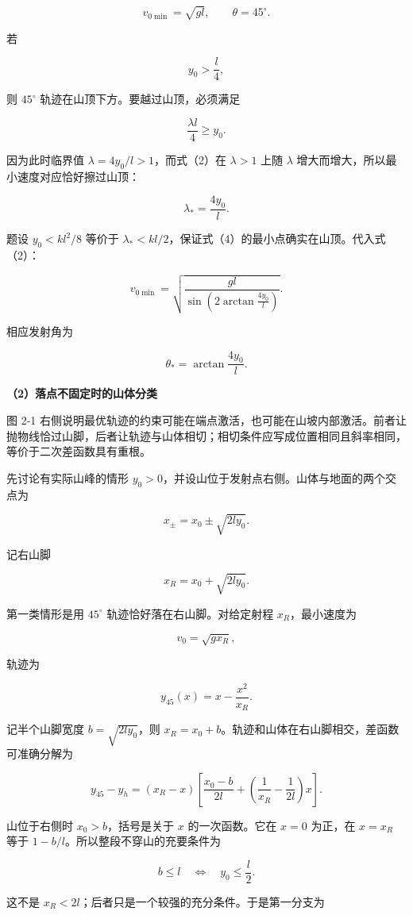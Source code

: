 \documentclass[12pt,a4paper,UTF8]{ctexart}
\begin{document}
\[\boxed{v_{0\min}=\sqrt{gl},\qquad\theta=45^\circ}. \tag{7}\]

若

\[y_0>\frac l4, \tag{8}\]

则 \(45^\circ\) 轨迹在山顶下方。要越过山顶，必须满足

\[\frac{\lambda l}{4}\geq y_0.\]

因为此时临界值 \(\lambda=4y_0/l>1\)，而式（2）在 \(\lambda>1\) 上随
\(\lambda\) 增大而增大，所以最小速度对应恰好擦过山顶：

\[\lambda_*=\frac{4y_0}{l}. \tag{9}\]

题设 \(y_0<kl^2/8\) 等价于
\(\lambda_*<kl/2\)，保证式（4）的最小点确实在山顶。代入式（2）：

\[\boxed{
v_{0\min}
=\sqrt{\frac{gl}{\sin\left(2\arctan\frac{4y_0}{l}\right)}}
}. \tag{10}\]

相应发射角为

\[\boxed{\theta_*=\arctan\frac{4y_0}{l}}. \tag{11}\]

\textbf{（2）落点不固定时的山体分类}

图 2-1
右侧说明最优轨迹的约束可能在端点激活，也可能在山坡内部激活。前者让抛物线恰过山脚，后者让轨迹与山体相切；相切条件应写成位置相同且斜率相同，等价于二次差函数具有重根。

先讨论有实际山峰的情形
\(y_0>0\)，并设山位于发射点右侧。山体与地面的两个交点为

\[x_\pm=x_0\pm\sqrt{2ly_0}.\]

记右山脚

\[x_R=x_0+\sqrt{2ly_0}. \tag{12}\]

第一类情形是用 \(45^\circ\) 轨迹恰好落在右山脚。对给定射程
\(x_R\)，最小速度为

\[v_0=\sqrt{gx_R},\]

轨迹为

\[y_{45}(x)=x-\frac{x^2}{x_R}. \tag{13}\]

记半个山脚宽度 \(b=\sqrt{2ly_0}\)，则
\(x_R=x_0+b\)。轨迹和山体在右山脚相交，差函数可准确分解为

\[y_{45}-y_h=(x_R-x)\left[\frac{x_0-b}{2l}+\left(\frac1{x_R}-\frac1{2l}\right)x\right].\]

山位于右侧时 \(x_0>b\)，括号是关于 \(x\) 的一次函数。它在 \(x=0\)
为正，在 \(x=x_R\) 等于 \(1-b/l\)。所以整段不穿山的充要条件为

\[b\le l\quad\Longleftrightarrow\quad y_0\le\frac l2. \tag{14}\]

这不是 \(x_R<2l\)；后者只是一个较强的充分条件。于是第一分支为
\end{document}
